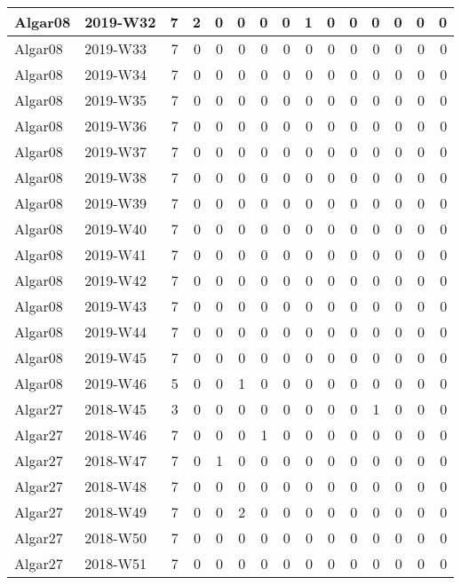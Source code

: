 \documentclass[]{book}
\begin{document}
\begin{table}
\begin{tabular}[t]{l|l|r|r|r|r|r|r|r|r|r|r|r|r|r}
\hline
Algar08 & 2019-W32 & 7 & 2 & 0 & 0 & 0 & 0 & 1 & 0 & 0 & 0 & 0 & 0 & 0\\
\hline
Algar08 & 2019-W33 & 7 & 0 & 0 & 0 & 0 & 0 & 0 & 0 & 0 & 0 & 0 & 0 & 0\\
\hline
Algar08 & 2019-W34 & 7 & 0 & 0 & 0 & 0 & 0 & 0 & 0 & 0 & 0 & 0 & 0 & 0\\
\hline
Algar08 & 2019-W35 & 7 & 0 & 0 & 0 & 0 & 0 & 0 & 0 & 0 & 0 & 0 & 0 & 0\\
\hline
Algar08 & 2019-W36 & 7 & 0 & 0 & 0 & 0 & 0 & 0 & 0 & 0 & 0 & 0 & 0 & 0\\
\hline
Algar08 & 2019-W37 & 7 & 0 & 0 & 0 & 0 & 0 & 0 & 0 & 0 & 0 & 0 & 0 & 0\\
\hline
Algar08 & 2019-W38 & 7 & 0 & 0 & 0 & 0 & 0 & 0 & 0 & 0 & 0 & 0 & 0 & 0\\
\hline
Algar08 & 2019-W39 & 7 & 0 & 0 & 0 & 0 & 0 & 0 & 0 & 0 & 0 & 0 & 0 & 0\\
\hline
Algar08 & 2019-W40 & 7 & 0 & 0 & 0 & 0 & 0 & 0 & 0 & 0 & 0 & 0 & 0 & 0\\
\hline
Algar08 & 2019-W41 & 7 & 0 & 0 & 0 & 0 & 0 & 0 & 0 & 0 & 0 & 0 & 0 & 0\\
\hline
Algar08 & 2019-W42 & 7 & 0 & 0 & 0 & 0 & 0 & 0 & 0 & 0 & 0 & 0 & 0 & 0\\
\hline
Algar08 & 2019-W43 & 7 & 0 & 0 & 0 & 0 & 0 & 0 & 0 & 0 & 0 & 0 & 0 & 0\\
\hline
Algar08 & 2019-W44 & 7 & 0 & 0 & 0 & 0 & 0 & 0 & 0 & 0 & 0 & 0 & 0 & 0\\
\hline
Algar08 & 2019-W45 & 7 & 0 & 0 & 0 & 0 & 0 & 0 & 0 & 0 & 0 & 0 & 0 & 0\\
\hline
Algar08 & 2019-W46 & 5 & 0 & 0 & 1 & 0 & 0 & 0 & 0 & 0 & 0 & 0 & 0 & 0\\
\hline
Algar27 & 2018-W45 & 3 & 0 & 0 & 0 & 0 & 0 & 0 & 0 & 0 & 1 & 0 & 0 & 0\\
\hline
Algar27 & 2018-W46 & 7 & 0 & 0 & 0 & 1 & 0 & 0 & 0 & 0 & 0 & 0 & 0 & 0\\
\hline
Algar27 & 2018-W47 & 7 & 0 & 1 & 0 & 0 & 0 & 0 & 0 & 0 & 0 & 0 & 0 & 0\\
\hline
Algar27 & 2018-W48 & 7 & 0 & 0 & 0 & 0 & 0 & 0 & 0 & 0 & 0 & 0 & 0 & 0\\
\hline
Algar27 & 2018-W49 & 7 & 0 & 0 & 2 & 0 & 0 & 0 & 0 & 0 & 0 & 0 & 0 & 0\\
\hline
Algar27 & 2018-W50 & 7 & 0 & 0 & 0 & 0 & 0 & 0 & 0 & 0 & 0 & 0 & 0 & 0\\
\hline
Algar27 & 2018-W51 & 7 & 0 & 0 & 0 & 0 & 0 & 0 & 0 & 0 & 0 & 0 & 0 & 0\\

\end{tabular}
\end{table}
\end{document}
